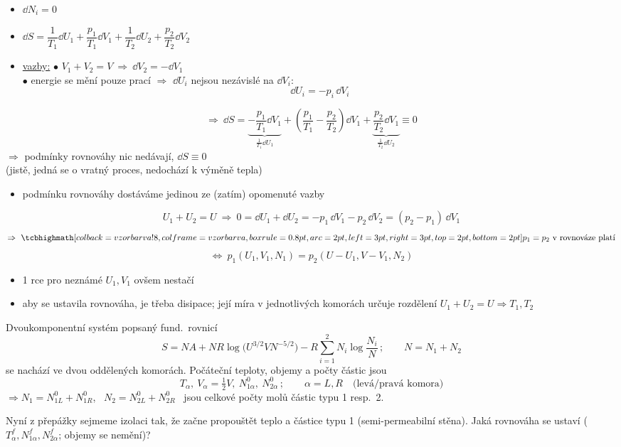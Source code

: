 \color{NavyBlue}
\begin{itemize}
  \item $\dd N_i = 0$
  \item $\dd S = \dfrac{1}{T_1}\dd U_1 + \dfrac{p_1}{T_1}\dd V_1 + \dfrac{1}{T_2}\dd U_2 + \dfrac{p_2}{T_2}\dd V_2$
  \item \underline{vazby:} \quad $\bullet$ $V_1 + V_2 = V \ \Rightarrow\ \dd V_2 = -\dd V_1$ \\
  \hspace*{1.8cm} $\bullet$ energie se mění pouze prací $\Rightarrow$ $\dd U_i$ nejsou nezávislé na $\dd V_i$:
  \[ \dd U_i = -p_i\,\dd V_i \]
\end{itemize}
\[
  \Rightarrow\ \dd S = \underbrace{-\frac{p_1}{T_1}\dd V_1}_{\frac{1}{T_1}\dd U_1} + \left(\frac{p_1}{T_1} - \frac{p_2}{T_2}\right)\dd V_1 + \underbrace{\frac{p_2}{T_2}\dd V_1}_{\frac{1}{T_2}\dd U_2} \equiv 0
\]
$\Rightarrow$ podmínky rovnováhy nic nedávají, $\dd S\equiv 0$ \\
\quad (jistě, jedná se o vratný proces, nedochází k výměně tepla)
\begin{itemize}
  \item podmínku rovnováhy dostáváme jedinou ze (zatím) opomenuté vazby
\end{itemize}
\[
  U_1 + U_2 = U \ \Rightarrow\ 0 = \dd U_1 + \dd U_2 = -p_1\,\dd V_1 - p_2\,\dd V_2 = (p_2 - p_1)\,\dd V_1
\]
\[
  \Rightarrow\ \vzorec{p_1 = p_2} \text{ v rovnováze platí}
\]
\[
  \Leftrightarrow\ p_1(U_1,V_1,N_1) = p_2(U - U_1, V - V_1, N_2)
\]
\begin{itemize}
  \item 1 rce pro neznámé $U_1, V_1$ ovšem nestačí
  \item aby se ustavila rovnováha, je třeba disipace; její míra v jednotlivých komorách určuje rozdělení $U_1 + U_2 = U \Rightarrow T_1, T_2$
\end{itemize}
\color{black}

\begin{priklad}
Dvoukomponentní systém popsaný fund.\ rovnicí
\[
  S = NA + NR\log\big(U^{3/2}VN^{-5/2}\big) - R\sum_{i=1}^2 N_i\log\frac{N_i}{N}\,; \qquad N = N_1 + N_2
\]
se nachází ve dvou oddělených komorách. Počáteční teploty, objemy a počty částic jsou
\[
  T_\alpha,\ V_\alpha = \tfrac12 V,\ N_{1\alpha}^0,\ N_{2\alpha}^0\,; \qquad \alpha = L, R \quad \text{(levá/pravá komora)}
\]
$\Rightarrow N_1 = N_{1L}^0 + N_{1R}^0$, \ $N_2 = N_{2L}^0 + N_{2R}^0$ \ jsou celkové počty molů částic typu 1 resp.\ 2.

Nyní z přepážky sejmeme izolaci tak, že začne propouštět teplo a částice typu 1 (semi-permeabilní stěna). Jaká rovnováha se ustaví ($T_\alpha^f, N_{1\alpha}^f, N_{2\alpha}^f$; objemy se nemění)?
\end{priklad}

